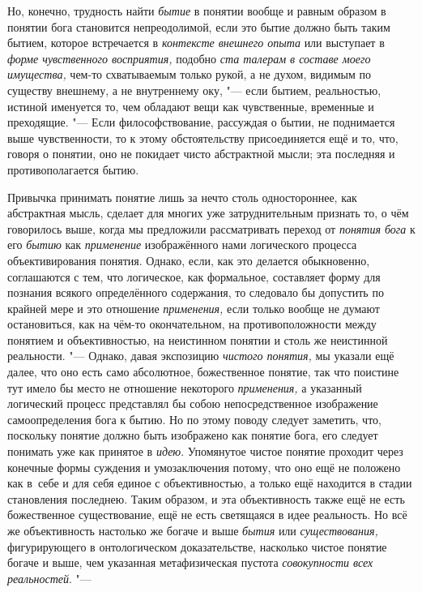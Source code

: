 Но, конечно, трудность найти {\em бытие} в понятии
вообще и равным образом в понятии бога становится непреодолимой, если это
бытие должно быть таким бытием, которое встречается в
{\em контексте внешнего опыта} или выступает в {\em форме
чувственного восприятия,} подобно {\em ста талерам в составе моего
имущества,} чем-то схватываемым только рукой, а не духом,
видимым по существу внешнему, а не внутреннему оку, "--- если
бытием, реальностью, истиной именуется то, чем обладают вещи как
чувственные, временные и преходящие. "--- Если
философствование, рассуждая о бытии, не поднимается выше чувственности, то
к этому обстоятельству присоединяется ещё и то, что, говоря о понятии, оно
не покидает чисто абстрактной мысли; эта последняя и противополагается бытию.

Привычка принимать понятие лишь за нечто столь одностороннее,
как абстрактная мысль, сделает для многих уже затруднительным признать то,
о чём говорилось выше, когда мы предложили рассматривать переход от
{\em понятия бога} к его {\em бытию} как {\em применение}
изображённого нами логического процесса объективирования
понятия. Однако, если, как это делается обыкновенно, соглашаются с тем, что
логическое, как формальное, составляет форму для познания всякого
определённого содержания, то следовало бы допустить по крайней мере и это
отношение {\em применения,}
если только вообще не думают остановиться, как на чём-то
окончательном, на противоположности между понятием и объективностью, на
неистинном понятии и столь же неистинной реальности. "---
Однако, давая экспозицию {\em чистого понятия,} мы
указали ещё далее, что оно есть само абсолютное, божественное понятие, так
что поистине тут имело бы место не отношение некоторого {\em применения,} а
указанный логический процесс представлял бы собою непосредственное
изображение самоопределения бога к бытию. Но по этому поводу следует
заметить, что, поскольку понятие должно быть изображено как понятие бога,
его следует понимать уже как принятое в {\em идею}. Упомянутое
чистое понятие проходит через конечные формы суждения и
умозаключения потому, что оно ещё не положено как в~себе и для себя единое
с объективностью, а только ещё находится в стадии становления последнею.
Таким образом, и эта объективность также ещё не есть божественное
существование, ещё не есть светящаяся в идее реальность. Но всё же
объективность настолько же богаче и выше {\em бытия} или {\em существования,}
фигурирующего в онтологическом доказательстве, насколько
чистое понятие богаче и выше, чем указанная метафизическая пустота
{\em совокупности всех реальностей}. "---
